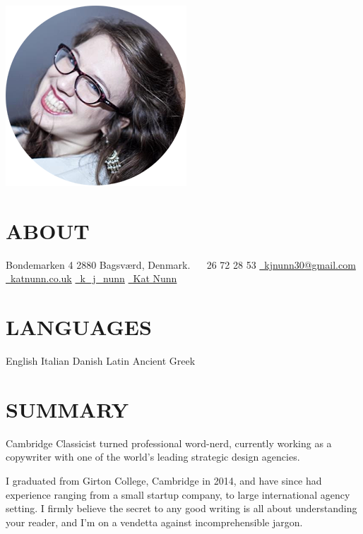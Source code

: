 \documentclass[]{friggeri-cv}
\begin{document}
       {}

\begin{aside}
  \includegraphics[width=.66\textwidth]{../img/profile.png}
  \section{ABOUT}
    Bondemarken 4
    2880 Bagsværd,
    Denmark.
    ~
	\faPhone~26 72 28 53
	\href{mailto:kjnunn30@gmail.com}{\faEnvelope~kjnunn30@gmail.com}
	\href{https://katnunn.co.uk}{\faGlobe~katnunn.co.uk}
	\href{https://twitter.com/k\_j\_nunn}{\faTwitter~k\_j\_nunn}
	\href{http://uk.linkedin.com/in/katnunn/}{\faLinkedin~Kat Nunn}
  \section{LANGUAGES}
    English
    Italian
    Danish
    Latin
    Ancient Greek
\end{aside}

\section{SUMMARY}
Cambridge Classicist turned professional word-nerd, currently working as a copywriter with one of the world's leading strategic \mbox{design} agencies. 

I graduated from Girton College, Cambridge in 2014, and have since had experience ranging from a small startup company, to large international agency setting. I firmly believe the secret to any good writing is all about understanding your reader, and I'm on a vendetta against incomprehensible jargon. 
\end{document}
